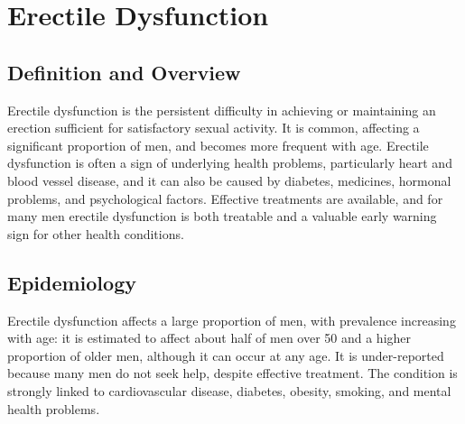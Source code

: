 \chapter{Erectile Dysfunction}

\section*{Definition and Overview}
Erectile dysfunction is the persistent difficulty in achieving or maintaining an erection sufficient for satisfactory sexual activity. It is common, affecting a significant proportion of men, and becomes more frequent with age. Erectile dysfunction is often a sign of underlying health problems, particularly heart and blood vessel disease, and it can also be caused by diabetes, medicines, hormonal problems, and psychological factors. Effective treatments are available, and for many men erectile dysfunction is both treatable and a valuable early warning sign for other health conditions.

\section*{Epidemiology}
Erectile dysfunction affects a large proportion of men, with prevalence increasing with age: it is estimated to affect about half of men over 50 and a higher proportion of older men, although it can occur at any age. It is under-reported because many men do not seek help, despite effective treatment. The condition is strongly linked to cardiovascular disease, diabetes, obesity, smoking, and mental health problems.

